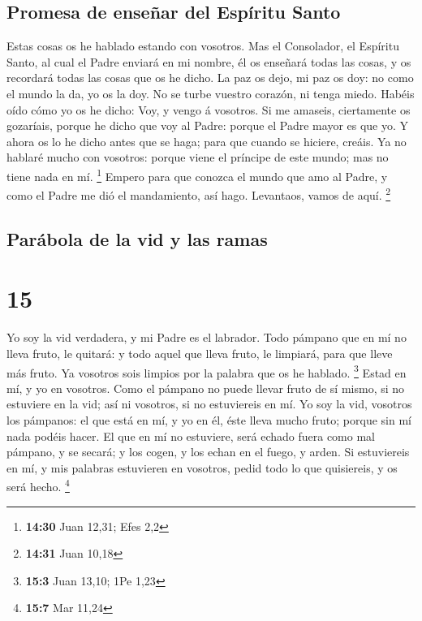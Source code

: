 \hypertarget{promesa-de-enseuxf1ar-del-espuxedritu-santo}{%
\subsection{Promesa de enseñar del Espíritu
Santo}\label{promesa-de-enseuxf1ar-del-espuxedritu-santo}}

 Estas cosas os he hablado estando con vosotros.
 Mas el Consolador, el Espíritu Santo, al cual el Padre
enviará en mi nombre, él os enseñará todas las cosas, y os recordará
todas las cosas que os he dicho.  La paz os dejo, mi paz
os doy: no como el mundo la da, yo os la doy. No se turbe vuestro
corazón, ni tenga miedo.  Habéis oído cómo yo os he
dicho: Voy, y vengo á vosotros. Si me amaseis, ciertamente os gozaríais,
porque he dicho que voy al Padre: porque el Padre mayor es que yo.
 Y ahora os lo he dicho antes que se haga; para que
cuando se hiciere, creáis.  Ya no hablaré mucho con
vosotros: porque viene el príncipe de este mundo; mas no tiene nada en
mí. \footnote{\textbf{14:30} Juan 12,31; Efes 2,2} 
Empero para que conozca el mundo que amo al Padre, y como el Padre me
dió el mandamiento, así hago. Levantaos, vamos de aquí. \footnote{\textbf{14:31}
  Juan 10,18}

\hypertarget{paruxe1bola-de-la-vid-y-las-ramas}{%
\subsection{Parábola de la vid y las
ramas}\label{paruxe1bola-de-la-vid-y-las-ramas}}

\hypertarget{section-14}{%
\section{15}\label{section-14}}

 Yo soy la vid verdadera, y mi Padre es el labrador.
 Todo pámpano que en mí no lleva fruto, le quitará: y todo
aquel que lleva fruto, le limpiará, para que lleve más fruto.
 Ya vosotros sois limpios por la palabra que os he
hablado. \footnote{\textbf{15:3} Juan 13,10; 1Pe 1,23} 
Estad en mí, y yo en vosotros. Como el pámpano no puede llevar fruto de
sí mismo, si no estuviere en la vid; así ni vosotros, si no estuviereis
en mí.  Yo soy la vid, vosotros los pámpanos: el que está
en mí, y yo en él, éste lleva mucho fruto; porque sin mí nada podéis
hacer.  El que en mí no estuviere, será echado fuera como
mal pámpano, y se secará; y los cogen, y los echan en el fuego, y arden.
 Si estuviereis en mí, y mis palabras estuvieren en
vosotros, pedid todo lo que quisiereis, y os será hecho. \footnote{\textbf{15:7}
  Mar 11,24}

